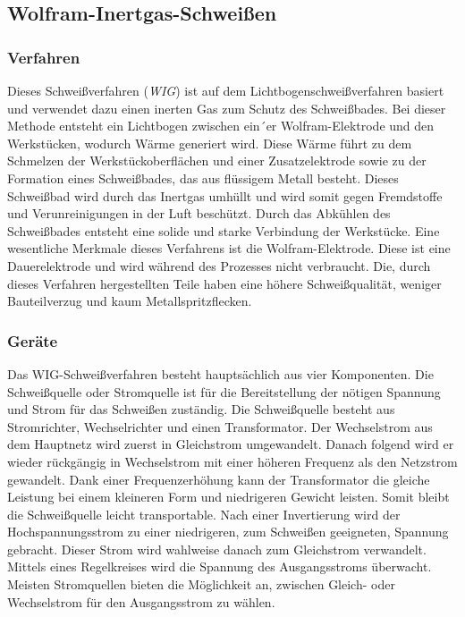 \subsection{Wolfram-Inertgas-Schweißen}
\subsubsection{Verfahren}
Dieses Schweißverfahren (\emph{WIG}) ist auf dem Lichtbogenschweißverfahren basiert und verwendet dazu einen inerten Gas zum Schutz des Schweißbades. Bei dieser Methode entsteht ein Lichtbogen zwischen ein´er Wolfram-Elektrode und den Werkstücken, wodurch Wärme generiert wird. Diese Wärme führt zu dem Schmelzen der Werkstückoberflächen und einer Zusatzelektrode sowie zu der Formation eines Schweißbades, das aus flüssigem Metall besteht. Dieses Schweißbad wird durch das Inertgas umhüllt und wird somit gegen Fremdstoffe und Verunreinigungen in der Luft beschützt. Durch das Abkühlen des Schweißbades entsteht eine solide und starke Verbindung der Werkstücke. Eine wesentliche Merkmale dieses Verfahrens ist die Wolfram-Elektrode. Diese ist eine Dauerelektrode und wird während des Prozesses nicht verbraucht. Die, durch dieses Verfahren hergestellten Teile haben eine höhere Schweißqualität, weniger Bauteilverzug und kaum Metallspritzflecken. \autocite[27-28]{Pires_WeldingRobots_2006}

\subsubsection{Geräte}
Das WIG-Schweißverfahren besteht hauptsächlich aus vier Komponenten. Die Schweißquelle oder Stromquelle ist für die Bereitstellung der nötigen Spannung und Strom für das Schweißen zuständig. Die Schweißquelle besteht aus Stromrichter, Wechselrichter und einen Transformator. Der Wechselstrom aus dem Hauptnetz wird zuerst in Gleichstrom umgewandelt. Danach folgend wird er wieder rückgängig in Wechselstrom mit einer höheren Frequenz als den Netzstrom gewandelt. Dank einer Frequenzerhöhung kann der Transformator die gleiche Leistung bei einem kleineren Form und niedrigeren Gewicht leisten. Somit bleibt die Schweißquelle leicht transportable. Nach einer Invertierung wird der Hochspannungsstrom zu einer niedrigeren, zum Schweißen geeigneten, Spannung gebracht. Dieser Strom wird wahlweise danach zum Gleichstrom verwandelt. Mittels eines Regelkreises wird die Spannung des Ausgangsstroms überwacht. Meisten Stromquellen bieten die Möglichkeit an, zwischen Gleich- oder Wechselstrom für den Ausgangsstrom zu wählen. \autocite[28]{Pires_WeldingRobots_2006}

